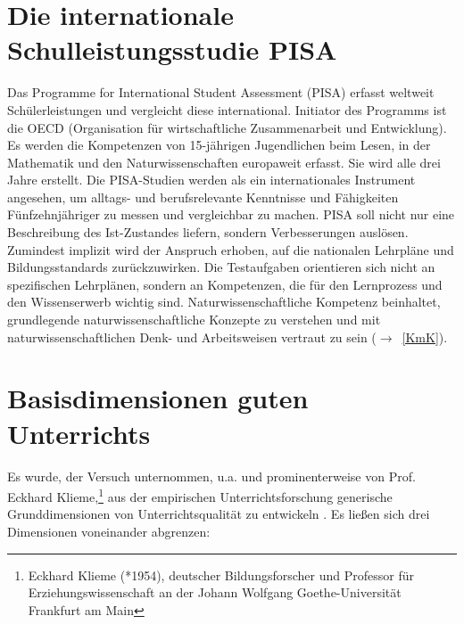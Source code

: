 \section{Die internationale Schulleistungsstudie PISA}
Das {\glqq}Programme for International Student Assessment{\grqq} (PISA) erfasst weltweit Sch{\"u}lerleistungen und vergleicht diese international. 
Initiator des Programms ist die OECD (Organisation f{\"u}r wirtschaftliche Zusammenarbeit und Entwicklung). Es werden 
 die Kompetenzen von 15-j{\"a}hrigen Jugendlichen beim Lesen, in der Mathematik
und den Naturwissenschaften europaweit erfasst. Sie wird alle drei Jahre erstellt. Die PISA-Studien werden als ein internationales 
Instrument angesehen, um alltags- und berufsrelevante Kenntnisse und F{\"a}higkeiten F{\"u}nfzehnj{\"a}hriger zu messen und vergleichbar zu machen.
PISA soll nicht nur eine Beschreibung des Ist-Zustandes liefern, sondern Verbesserungen ausl{\"o}sen. Zumindest  implizit wird der Anspruch 
erhoben, auf die nationalen Lehrpl{\"a}ne und Bildungsstandards zur{\"u}ckzuwirken.
\mip
Die Testaufgaben orientieren sich nicht an spezifischen Lehrpl\"{a}nen, sondern an Kompetenzen, die f{\"u}r den
Lernprozess und den Wissenserwerb wichtig sind. Naturwissenschaftliche Kompetenz beinhaltet, grundlegende 
naturwissenschaftliche Konzepte zu verstehen und mit naturwissenschaftlichen Denk- und Arbeitsweisen
vertraut zu sein ($\to$~\cref{KmK}).  

\bip\bip
\section{Basisdimensionen guten Unterrichts}

Es wurde,  der Versuch unternommen, u.a. und prominenterweise von Prof. Eckhard Klieme,\footnote{Eckhard Klieme (*1954), deutscher Bildungsforscher und Professor f{\"u}r Erziehungswissenschaft an der Johann Wolfgang Goethe-Universit{\"a}t Frankfurt am Main} aus der empirischen Unterrichtsforschung generische Grunddimensionen von Unterrichtsqualit{\"a}t zu entwickeln \autocite{Klieme}. Es lie{\ss}en sich drei Dimensionen voneinander abgrenzen:

